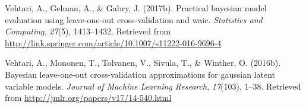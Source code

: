 \documentclass[english,,doc,floatsintext]{apa6}
\theoremstyle{definition}
\theoremstyle{definition}
\theoremstyle{definition}
\theoremstyle{remark}
\begin{document}
\leavevmode\hypertarget{ref-vehtari2017a}{}%
Vehtari, A., Gelman, A., \& Gabry, J. (2017b). Practical bayesian model
evaluation using leave-one-out cross-validation and waic.
\emph{Statistics and Computing}, \emph{27}(5), 1413--1432. Retrieved
from \url{http://link.springer.com/article/10.1007/s11222-016-9696-4}

\leavevmode\hypertarget{ref-vehtari2016}{}%
Vehtari, A., Mononen, T., Tolvanen, V., Sivula, T., \& Winther, O.
(2016b). Bayesian leave-one-out cross-validation approximations for
gaussian latent variable models. \emph{Journal of Machine Learning
Research}, \emph{17}(103), 1--38. Retrieved from
\url{http://jmlr.org/papers/v17/14-540.html}
\end{document}
